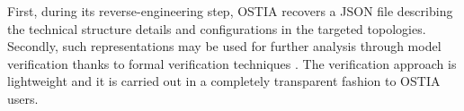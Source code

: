 First, during its reverse-engineering step, OSTIA recovers a JSON file describing the technical structure details and configurations in the targeted topologies.
%
Secondly, such representations may be used for further analysis through model verification thanks to formal verification techniques \cite{icsoft}. 
The verification approach is lightweight and it is carried out in a completely transparent fashion to OSTIA users.

